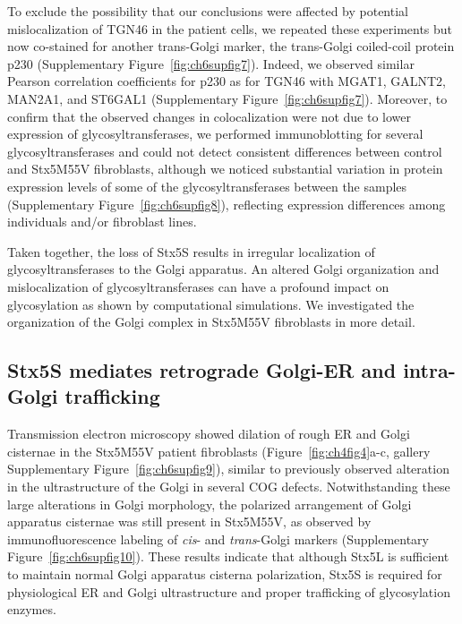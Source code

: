 To exclude the possibility that our conclusions were affected by potential mislocalization of TGN46 in the patient cells, we repeated these experiments but now co-stained for another trans-Golgi marker, the trans-Golgi coiled-coil protein p230\cite{gleeson_p230_1996} (Supplementary Figure~\ref{fig:ch6supfig7}). Indeed, we observed similar Pearson correlation coefficients for p230 as for TGN46 with MGAT1, GALNT2, MAN2A1, and ST6GAL1 (Supplementary Figure~\ref{fig:ch6supfig7}). Moreover, to confirm that the observed changes in colocalization were not due to lower expression of glycosyltransferases, we performed immunoblotting for several glycosyltransferases and could not detect consistent differences between control and Stx5M55V fibroblasts, although we noticed substantial variation in protein expression levels of some of the glycosyltransferases between the samples (Supplementary Figure~\ref{fig:ch6supfig8}), reflecting expression differences among individuals and/or fibroblast lines.

Taken together, the loss of Stx5S results in irregular localization of glycosyltransferases to the Golgi apparatus. An altered Golgi organization and mislocalization of glycosyltransferases can have a profound impact on glycosylation as shown by computational simulations\cite{jaiman_golgi_2020}. We investigated the organization of the Golgi complex in Stx5M55V fibroblasts in more detail.

\subsection{Stx5S mediates retrograde Golgi-ER and intra-Golgi trafficking}

Transmission electron microscopy showed dilation of rough ER and Golgi cisternae in the Stx5M55V patient fibroblasts (Figure~\ref{fig:ch4fig4}a-c, gallery Supplementary Figure~\ref{fig:ch6supfig9}), similar to previously observed alteration in the ultrastructure of the Golgi in several COG defects\cite{reynders_golgi_2009,climer_membrane_2018,oka_genetic_2005}. Notwithstanding these large alterations in Golgi morphology, the polarized arrangement of Golgi apparatus cisternae was still present in Stx5M55V, as observed by immunofluorescence labeling of \emph{cis}- and \emph{trans}-Golgi markers (Supplementary Figure~\ref{fig:ch6supfig10}). These results indicate that although Stx5L is sufficient to maintain normal Golgi apparatus cisterna polarization, Stx5S is required for physiological ER and Golgi ultrastructure and proper trafficking of glycosylation enzymes. 

